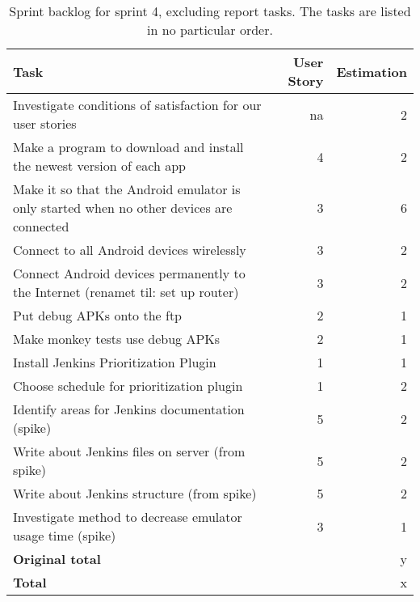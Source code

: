 \begin{table}%
  \centering
  \begin{tabular}{p{}rr}
    \toprule
    \textbf{Task} & \textbf{User Story} & \textbf{Estimation} \\
    \midrule
    Investigate conditions of satisfaction for our user stories & na & 2 \\
    Make a program to download and install the newest version of each app & 4 & 2 \\
    Make it so that the Android emulator is only started when no other devices are connected & 3 & 6 \\
    Connect to all Android devices wirelessly & 3 & 2 \\
    Connect Android devices permanently to the Internet (renamet til: set up router) & 3 & 2 \\
    Put debug APKs onto the ftp & 2 & 1 \\
    Make monkey tests use debug APKs & 2 & 1 \\
    Install Jenkins Prioritization Plugin & 1 & 1 \\
    Choose schedule for prioritization plugin & 1 & 2 \\
    Identify areas for Jenkins documentation (spike) & 5 & 2 \\
    Write about Jenkins files on server (from spike) & 5 & 2 \\
    Write about Jenkins structure (from spike) & 5 & 2 \\
    Investigate method to decrease emulator usage time (spike) & 3 & 1 \\
    \midrule
    \textbf{Original total} & & y \\
    \textbf{Total} & & x \\
    \bottomrule
  \end{tabular}
\caption[Sprint 4 backlog]{Sprint backlog for sprint 4, excluding report tasks. The tasks are listed in no particular order.}
\label{tab:sprint4_tasks}
\end{table}